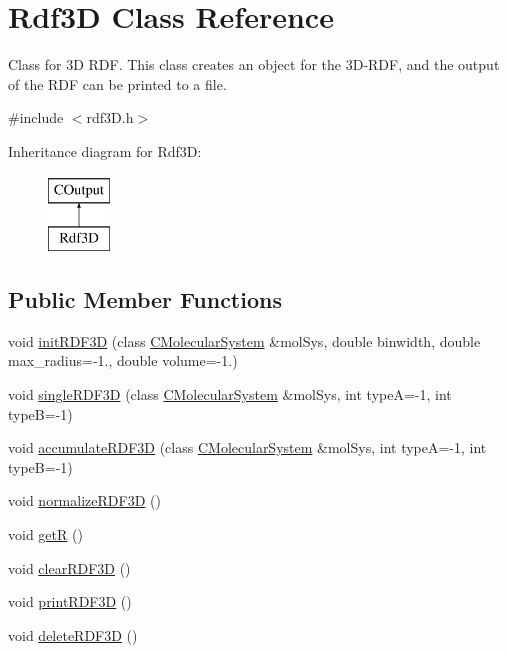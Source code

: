 \hypertarget{classRdf3D}{}\section{Rdf3D Class Reference}
\label{classRdf3D}


Class for 3D R\+DF. This class creates an object for the 3\+D-\/\+R\+DF, and the output of the R\+DF can be printed to a file.  




{\ttfamily \#include $<$rdf3\+D.\+h$>$}

Inheritance diagram for Rdf3D\+:\begin{figure}[H]
\begin{center}
\leavevmode
\includegraphics[height=2.000000cm]{classRdf3D}
\end{center}
\end{figure}
\subsection*{Public Member Functions}
\begin{DoxyCompactItemize}
\item 
void \mbox{\hyperlink{classRdf3D_aa86b927b22b369cd1d6ead93c17e43ee}{init\+R\+D\+F3D}} (class \mbox{\hyperlink{classCMolecularSystem}{C\+Molecular\+System}} \&mol\+Sys, double binwidth, double max\+\_\+radius=-\/1., double volume=-\/1.)
\item 
void \mbox{\hyperlink{classRdf3D_a27efc547d859576b41a16d98cd2d1df9}{single\+R\+D\+F3D}} (class \mbox{\hyperlink{classCMolecularSystem}{C\+Molecular\+System}} \&mol\+Sys, int typeA=-\/1, int typeB=-\/1)
\item 
void \mbox{\hyperlink{classRdf3D_aca3e0b2da042856d705b4bca8f6be335}{accumulate\+R\+D\+F3D}} (class \mbox{\hyperlink{classCMolecularSystem}{C\+Molecular\+System}} \&mol\+Sys, int typeA=-\/1, int typeB=-\/1)
\item 
void \mbox{\hyperlink{classRdf3D_a08d573ef51fd88bd42456a76fc3d7ca4}{normalize\+R\+D\+F3D}} ()
\item 
void \mbox{\hyperlink{classRdf3D_ade47a2d360bcc0112f0da45baef6e609}{getR}} ()
\item 
void \mbox{\hyperlink{classRdf3D_afff83789d5d90cd9cdbf9f7287cd785a}{clear\+R\+D\+F3D}} ()
\item 
void \mbox{\hyperlink{classRdf3D_a76fdc87564a586883c4f290fff3172b2}{print\+R\+D\+F3D}} ()
\item 
void \mbox{\hyperlink{classRdf3D_a6af1bf5b0301a6b43d9f0fffdb868c9c}{delete\+R\+D\+F3D}} ()
\end{DoxyCompactItemize}
